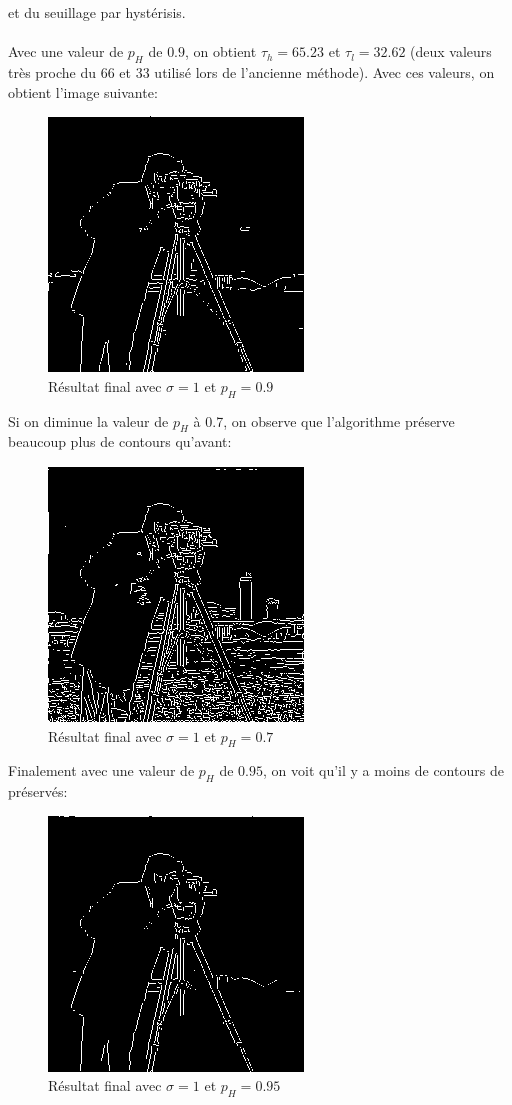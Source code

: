 \documentclass{article}
\begin{document}
et du seuillage par hystérisis. \\\\
Avec une valeur de $p_H$ de $0.9$, on obtient $\tau_h = 65.23$ et $\tau_l = 32.62$ (deux valeurs très proche du 66 et 33 utilisé lors de l'ancienne méthode). 
Avec ces valeurs, on obtient l'image suivante:
\begin{figure}[H]
    \center
    \includegraphics[scale=0.5]{TpIFT6150-2-canny_09.png}
    \caption{Résultat final avec $\sigma = 1$ et $p_H = 0.9$}
\end{figure}
Si on diminue la valeur de $p_H$ à 0.7, on observe que l'algorithme préserve beaucoup plus de contours qu'avant:
\begin{figure}[H]
    \center
    \includegraphics[scale=0.5]{TpIFT6150-2-canny_07.png}
    \caption{Résultat final avec $\sigma = 1$ et $p_H = 0.7$}
\end{figure}
Finalement avec une valeur de $p_H$ de $0.95$, on voit qu'il y a moins de contours de préservés:
\begin{figure}[H]
    \center
    \includegraphics[scale=0.5]{TpIFT6150-2-canny_095.png}
    \caption{Résultat final avec $\sigma = 1$ et $p_H = 0.95$}
\end{figure}
\end{document}
